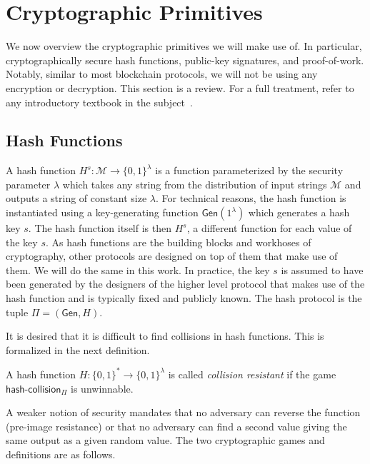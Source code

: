 \section{Cryptographic Primitives}

We now overview the cryptographic primitives we will make use of. In particular,
cryptographically secure hash functions, public-key signatures, and
proof-of-work. Notably, similar to most blockchain protocols, we will not be
using any encryption or decryption. This section is a review. For a full
treatment, refer to any introductory textbook in the subject~\cite{katz,handbook,foundations1,foundations2}.

\subsection{Hash Functions}
A hash function $H^s: \mathcal{M} \longrightarrow \{0, 1\}^\lambda$ is a function
parameterized by the security parameter $\lambda$ which takes any string from the distribution of input strings $\mathcal{M}$ and
outputs a string of constant size $\lambda$. For technical reasons, the hash
function is instantiated using a key-generating function
$\textsf{Gen}(1^\lambda)$ which generates a hash key $s$. The hash function itself is then $H^s$, a different function for each value of the key $s$. As hash functions are the building blocks and workhoses of cryptography, other protocols are designed on top of them that make use of them. We will do the same in this work. In practice, the key $s$ is assumed to have been generated by the designers of the higher level protocol that makes use of the hash function and is typically fixed and publicly known. The hash protocol is the tuple $\Pi = (\textsf{Gen}, H)$.

It is desired that it is difficult to find collisions in hash functions. This is
formalized in the next definition.



\begin{definition}
  A hash function $H: \{0, 1\}^* \longrightarrow \{0, 1\}^\lambda$ is called
  \emph{collision resistant} if the game $\textsf{hash-collision}_\Pi$ is unwinnable.
\end{definition}

A weaker notion of security mandates that no adversary can reverse the function (pre-image resistance) or that no adversary can find a second value giving the same output as a given random value. The two cryptographic games and definitions are as follows.

